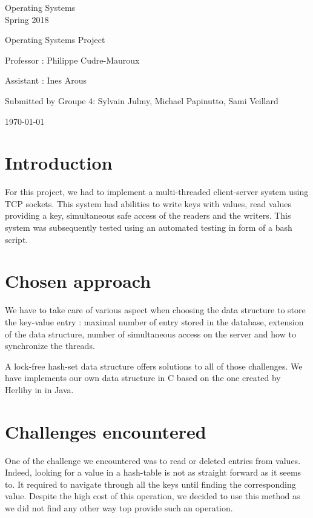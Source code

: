 \documentclass[a4paper,11pt]{report}
\begin{document}
  \begin{center}
    \Large{
    Operating Systems\\
    Spring 2018
    }

    \noindent\makebox[\linewidth]{\rule{\linewidth}{0.4pt}}
    Operating Systems Project
    \noindent\makebox[\linewidth]{\rule{\linewidth}{0.4pt}}

    \begin{flushleft}
      Professor : Philippe Cudre-Mauroux

      Assistant : Ines Arous
    \end{flushleft}

    \noindent\makebox[\linewidth]{\rule{\linewidth}{0.4pt}}

    Submitted by Groupe 4: Sylvain Julmy, Michael Papinutto, Sami Veillard

    \noindent\makebox[\linewidth]{\rule{\textwidth}{1pt}}
    \vspace*{0.8cm}
    \today

  \end{center}

  \newpage

  \section*{Introduction}
  For this project, we had to implement a multi-threaded client-server system using TCP sockets.
  This system had abilities to write keys with values, read values providing a key, simultaneous safe access of the readers and the writers.
  This system was subsequently tested using an automated testing in form of a bash script.

  \section*{Chosen approach}

  We have to take care of various aspect when choosing the data structure to
  store the key-value entry : maximal number of entry stored in the database,
  extension of the data structure, number of simultaneous access on the server and
  how to synchronize the threads.

  A lock-free hash-set data structure offers solutions to all of those challenges.
  We have implements our own data structure in C based on the one created by
   Herlihy in \cite{Herlihy2006} in Java.

  \section*{Challenges encountered}
  One of the challenge we encountered was to read or deleted entries from values.
  Indeed, looking for a value in a hash-table is not as straight forward as it seems to.
  It required to navigate through all the keys until finding the corresponding value.
  Despite the high cost of this operation, we decided to use this method as we did not find any other way top provide such an operation.
\end{document}
